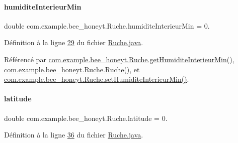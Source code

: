 \mbox{\label{classcom_1_1example_1_1bee__honeyt_1_1_ruche_ab8234d1bae28a10622b331d3b773445d}} 
\paragraph{\texorpdfstring{humidite\+Interieur\+Min}{humiditeInterieurMin}}
{\footnotesize\ttfamily double com.\+example.\+bee\+\_\+honeyt.\+Ruche.\+humidite\+Interieur\+Min = 0.\hspace{0.3cm}{\ttfamily [private]}}



Définition à la ligne \hyperlink{_ruche_8java_source_l00029}{29} du fichier \hyperlink{_ruche_8java_source}{Ruche.\+java}.



Référencé par \hyperlink{_ruche_8java_source_l00169}{com.\+example.\+bee\+\_\+honeyt.\+Ruche.\+get\+Humidite\+Interieur\+Min()}, \hyperlink{_ruche_8java_source_l00044}{com.\+example.\+bee\+\_\+honeyt.\+Ruche.\+Ruche()}, et \hyperlink{_ruche_8java_source_l00174}{com.\+example.\+bee\+\_\+honeyt.\+Ruche.\+set\+Humidite\+Interieur\+Min()}.

\mbox{\label{classcom_1_1example_1_1bee__honeyt_1_1_ruche_a6a75dfabd9812334d502756f91fa4aa9}} 
\paragraph{\texorpdfstring{latitude}{latitude}}
{\footnotesize\ttfamily double com.\+example.\+bee\+\_\+honeyt.\+Ruche.\+latitude = 0.\hspace{0.3cm}{\ttfamily [private]}}



Définition à la ligne \hyperlink{_ruche_8java_source_l00036}{36} du fichier \hyperlink{_ruche_8java_source}{Ruche.\+java}.



